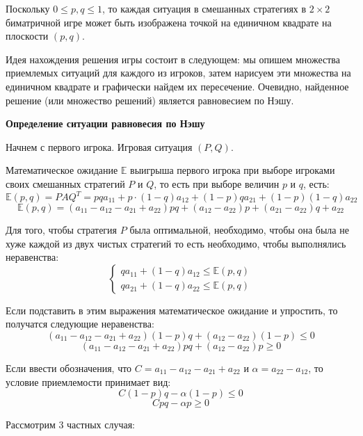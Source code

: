 \documentclass[aps,%
12pt,%
final,%
oneside,
onecolumn,%
musixtex, %
superscriptaddress,%
centertags]{article} %
\theoremstyle{plain}
\theoremstyle{definition}
\theoremstyle{remark}
\begin{document}
Поскольку $0 \leq p,q \leq 1$, то каждая ситуация в смешанных стратегиях в $2 \times 2$ биматричной игре может быть изображена точкой на единичном квадрате на плоскости $(p,q)$.

Идея нахождения решения игры состоит в следующем: мы опишем множества приемлемых ситуаций для каждого из игроков, затем нарисуем эти множества на единичном квадрате и графически найдем их пересечение. Очевидно, найденное решение (или множество решений) является равновесием по Нэшу.

\textbf{Определение ситуации равновесия по Нэшу}

Начнем с первого игрока. Игровая ситуация $(P,Q)$. 

Математическое ожидание $\mathbb{E}$ выигрыша первого игрока при выборе игроками своих смешанных стратегий $P$ и $Q$, то есть при выборе величин $p$ и $q$, есть:
$$ \mathbb{E}(p,q) = PAQ^T = pqa_{11} + p \cdot (1-q)a_{12} + (1-p)qa_{21} + (1-p)(1-q)a_{22} $$
$$\mathbb{E}(p,q) = (a_{11}-a_{12}-a_{21}+a_{22})pq + (a_{12}-a_{22})p + (a_{21}-a_{22})q + a_{22}$$

Для того, чтобы стратегия $P$ была оптимальной, необходимо, чтобы она была не хуже каждой из двух чистых стратегий  то есть необходимо, чтобы выполнялись неравенства:
$$\left \{
\begin{matrix}
 qa_{11} + (1-q)a_{12} \leq \mathbb{E}(p,q)   \\
qa_{21} + (1-q)a_{22} \leq \mathbb{E}(p,q)  
\end{matrix} \right .$$

Если подставить в этим выражения математическое ожидание и упростить, то получатся следующие неравенства:
$$(a_{11}-a_{12}-a_{21}+a_{22})(1-p)q+(a_{12}-a_{22})(1-p) \leq 0$$
$$(a_{11}-a_{12}-a_{21}+a_{22})pq + (a_{12}-a_{22})p \geq 0$$

Если ввести обозначения, что $C=a_{11}-a_{12}-a_{21}+a_{22}$ и $\alpha = a_{22} - a_{12}$, то условие приемлемости принимает вид:
$$C(1-p)q - \alpha(1-p) \leq 0$$
$$Cpq -\alpha p \geq 0$$

Рассмотрим $3$ частных случая:
\end{document}
